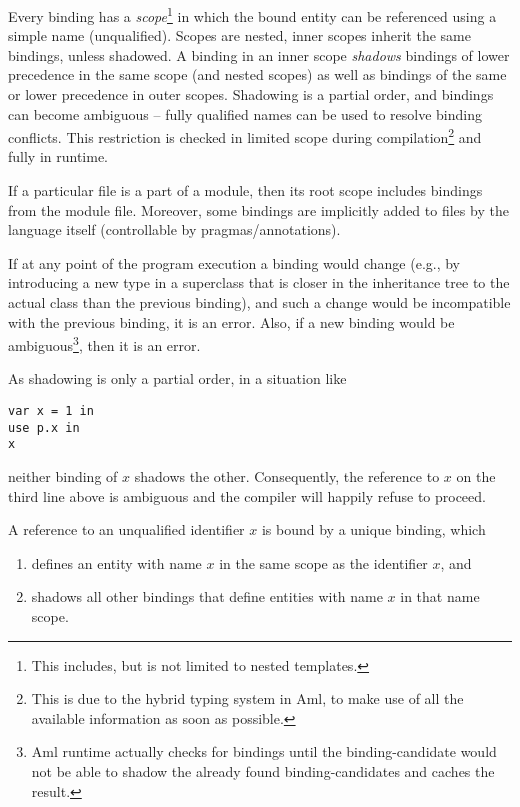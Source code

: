 Every binding has a \emph{scope}\footnote{This includes, but is not limited to nested templates.} in which the bound entity can be referenced using a simple name (unqualified). Scopes are nested, inner scopes inherit the same bindings, unless shadowed. A binding in an inner scope \emph{shadows} bindings of lower precedence in the same scope (and nested scopes) as well as bindings of the same or lower precedence in outer scopes. Shadowing is a partial order, and bindings can become ambiguous -- fully qualified names can be used to resolve binding conflicts. This restriction is checked in limited scope during compilation\footnote{This is due to the hybrid typing system in Aml, to make use of all the available information as soon as possible.} and fully in runtime. 

If a particular file is a part of a module, then its root scope includes bindings from the module file. Moreover, some bindings are implicitly added to files by the language itself (controllable by pragmas/annotations). 

If at any point of the program execution a binding would change (e.g., by introducing a new type in a superclass that is closer in the inheritance tree to the actual class than the previous binding), and such a change would be incompatible with the previous binding, it is an error. Also, if a new binding would be ambiguous\footnote{Aml runtime actually checks for bindings until the binding-candidate would not be able to shadow the already found binding-candidates and caches the result.}, then it is an error. 

As shadowing is only a partial order, in a situation like

\begin{lstlisting}
var x = 1 in
use p.x in
x
\end{lstlisting}

neither binding of $x$ shadows the other. Consequently, the reference to $x$ on the third line above is ambiguous and the compiler will happily refuse to proceed. 

A reference to an unqualified identifier $x$ is bound by a unique binding, which

\begin{enumerate}
\item defines an entity with name $x$ in the same scope as the identifier $x$, and
\item shadows all other bindings that define entities with name $x$ in that name scope.
\end{enumerate}

